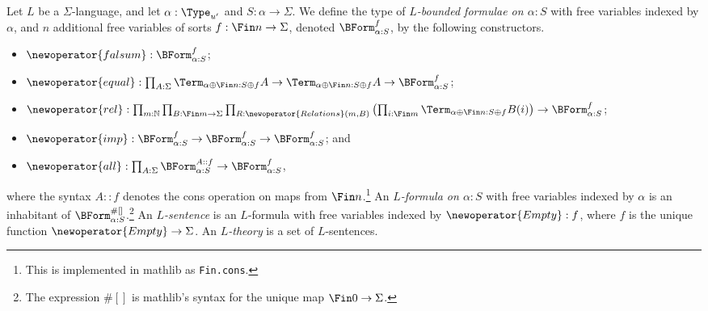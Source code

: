 \begin{definition}
  Let \( L \) be a \( \Sigma \)-language, and let \( \alpha : \Type_{u'} \) and \( S : \alpha \to \Sigma \).
  We define the type of \emph{\( L \)-bounded formulae on \( \alpha : S \)} with free variables indexed by \( \alpha \), and \( n \) additional free variables of sorts \( f : \Fin n \to \Sigma \), denoted \( \BForm_{\alpha:S}^f \), by the following constructors.
  \begin{itemize}
    \item \( \newoperator{falsum} : \BForm_{\alpha:S}^f \);
    \item \( \newoperator{equal} : \prod_{A : \Sigma} \Term_{\alpha \oplus \Fin n : S \oplus f} A \to \Term_{\alpha \oplus \Fin n : S \oplus f} A \to \BForm_{\alpha:S}^f \);
    \item \( \newoperator{rel} : \prod_{m : \mathbb N} \prod_{B : \Fin m \to \Sigma} \prod_{R : \newoperator{Relations}(m, B)} \left( \prod_{i : \Fin m} \Term_{\alpha \oplus \Fin n : S \oplus f} B(i) \right) \to \BForm_{\alpha:S}^f \);
    \item \( \newoperator{imp} : \BForm_{\alpha:S}^f \to \BForm_{\alpha:S}^f \to \BForm_{\alpha:S}^f \); and
    \item \( \newoperator{all} : \prod_{A : \Sigma} \BForm_{\alpha:S}^{A :: f} \to \BForm_{\alpha:S}^f \),
  \end{itemize}
  where the syntax \( A :: f \) denotes the cons operation on maps from \( \Fin n \).\footnote{This is implemented in mathlib as \texttt{Fin.cons}.}
  An \emph{\( L \)-formula on \( \alpha : S \)} with free variables indexed by \( \alpha \) is an inhabitant of \( \BForm_{\alpha:S}^{\#[]} \).\footnote{The expression \( \#[] \) is mathlib's syntax for the unique map \( \Fin 0 \to \Sigma \).}
  An \emph{\( L \)-sentence} is an \( L \)-formula with free variables indexed by \( \newoperator{Empty} : f \), where \( f \) is the unique function \( \newoperator{Empty} \to \Sigma \).
  An \emph{\( L \)-theory} is a set of \( L \)-sentences.
\end{definition}

